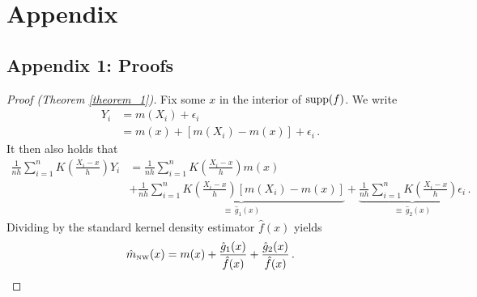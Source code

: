


{} 

\section*{Appendix}

\subsection*{Appendix 1: Proofs} \label{appendix_1}

\begin{proof}[Proof (Theorem \ref{theorem_1})]
	Fix some $x$ in the interior of $\operatorname{supp}(f)$.
	We write
	\begin{align}
		Y_i &= m(X_i) + \epsilon_i \\
		    &= m(x) + [m(X_i) - m(x)] + \epsilon_i \,.
	\end{align}
	It then also holds that
	\begin{align}
		\frac{1}{nh} \sum_{i = 1}^{n} K \left( \frac{X_i - x}{h} \right) Y_i &=
		\frac{1}{nh} \sum_{i = 1}^{n} K \left( \frac{X_i - x}{h} \right) m(x) \\
		&+ \underbrace{\frac{1}{nh} \sum_{i = 1}^{n} K \left( \frac{X_i - x}{h} \right) [m(X_i) - m(x)]}_{\equiv \, \hat{g}_1(x)} +
		\underbrace{\frac{1}{nh} \sum_{i = 1}^{n} K \left( \frac{X_i - x}{h} \right) \epsilon_i}_{\equiv \, \hat{g}_2(x)} \,.  
	\end{align}
	Dividing by the standard kernel density estimator $\hat{f}(x)$ yields
	\begin{equation}
		\hat{m}_{\textup{\tiny NW}}(x) = m(x) + \frac{\hat{g}_1(x)}{\hat{f}(x)} + \frac{\hat{g}_2(x)}{\hat{f}(x)} \,. \label{eq:appendix_1_01}
	\end{equation}
	

\end{proof}
